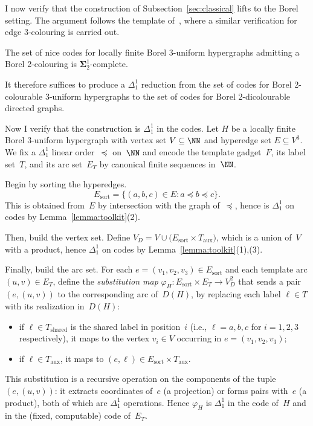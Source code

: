 I now verify that the construction of Subsection~\ref{sec:classical} lifts to the Borel setting.
The argument follows the template of~\cite[Theorem~A.9]{thornton2022algebraic}, where a similar verification for edge 3-colouring is carried out.

\begin{fact}\label{fact:hyp-borel}
The set of nice codes for locally finite Borel 3-uniform hypergraphs admitting a Borel 2-colouring is $\mathbf\Sigma^1_2$-complete.
\end{fact}

It therefore suffices to produce a $\Delta^1_1$ reduction from the set of codes for Borel 2-colourable 3-uniform hypergraphs to the set of codes for Borel 2-dicolourable directed graphs.

Now I verify that the construction is $\Delta^1_1$ in the codes.
Let $H$ be a locally finite Borel 3-uniform hypergraph with vertex set $V\subseteq\NN$ and hyperedge set $E\subseteq V^3$.
We fix a $\Delta^1_1$ linear order~$\preceq$ on~$\NN$ and encode the template gadget~$F$, its label set~$T$, and its arc set~$E_T$ by canonical finite sequences in~$\NN$.

Begin by sorting the hyperedges.
$$E_{\mathrm{sort}} = \{(a,b,c)\in E : a\preceq b\preceq c\}.$$
This is obtained from~$E$ by intersection with the graph of~$\preceq$, hence is $\Delta^1_1$ on codes by Lemma~\ref{lemma:toolkit}(2).

Then, build the vertex set.
Define $V_D = V \cup \bigl(E_{\mathrm{sort}}\times T_{\mathrm{aux}}\bigr)$, which is a union of~$V$ with a product, hence $\Delta^1_1$ on codes by Lemma~\ref{lemma:toolkit}(1),(3).

Finally, build the arc set.
For each $e = (v_1,v_2,v_3)\in E_{\mathrm{sort}}$ and each template arc $(u,v)\in E_T$, define the \emph{substitution map} $\varphi_H\colon E_{\mathrm{sort}}\times E_T\to V_D^2$ that sends a pair $(e,(u,v))$ to the corresponding arc of~$D(H)$, by replacing each label $\ell\in T$ with its realization in~$D(H)$:
\begin{itemize}[nosep]
	\item if $\ell\in T_{\mathrm{shared}}$ is the shared label in position~$i$ (i.e., $\ell = a,b,c$ for $i=1,2,3$ respectively), it maps to the vertex $v_i\in V$ occurring in $e=(v_1,v_2,v_3)$;
	\item if $\ell\in T_{\mathrm{aux}}$, it maps to $(e,\ell)\in E_{\mathrm{sort}}\times T_{\mathrm{aux}}$.
\end{itemize}
This substitution is a recursive operation on the components of the tuple $(e,(u,v))$: it extracts coordinates of~$e$ (a projection) or forms pairs with~$e$ (a product), both of which are $\Delta^1_1$ operations.
Hence $\varphi_H$ is $\Delta^1_1$ in the code of~$H$ and in the (fixed, computable) code of~$E_T$.

